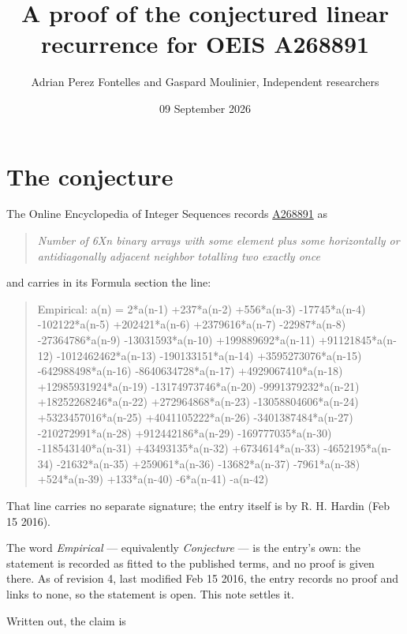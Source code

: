 \documentclass[11pt]{article}
\title{A proof of the conjectured linear recurrence for OEIS A268891}
\author{Adrian Perez Fontelles and Gaspard Moulinier, Independent researchers}
\date{09 September 2026}
\theoremstyle{definition}
\begin{document}
\maketitle
\section{The conjecture}

The Online Encyclopedia of Integer Sequences records \href{https://oeis.org/A268891}{A268891} as

\begin{quote}\itshape Number of 6Xn binary arrays with some element plus some horizontally or antidiagonally adjacent neighbor totalling two exactly once\end{quote}

and carries in its Formula section the line:

\begin{quote}\ttfamily Empirical: a(n) = 2*a(n-1) +237*a(n-2) +556*a(n-3) -17745*a(n-4) -102122*a(n-5) +202421*a(n-6) +2379616*a(n-7) -22987*a(n-8) -27364786*a(n-9) -13031593*a(n-10) +199889692*a(n-11) +91121845*a(n-12) -1012462462*a(n-13) -190133151*a(n-14) +3595273076*a(n-15) -642988498*a(n-16) -8640634728*a(n-17) +4929067410*a(n-18) +12985931924*a(n-19) -13174973746*a(n-20) -9991379232*a(n-21) +18252268246*a(n-22) +272964868*a(n-23) -13058804606*a(n-24) +5323457016*a(n-25) +4041105222*a(n-26) -3401387484*a(n-27) -210272991*a(n-28) +912442186*a(n-29) -169777035*a(n-30) -118543140*a(n-31) +43493135*a(n-32) +6734614*a(n-33) -4652195*a(n-34) -21632*a(n-35) +259061*a(n-36) -13682*a(n-37) -7961*a(n-38) +524*a(n-39) +133*a(n-40) -6*a(n-41) -a(n-42)\end{quote}

That line carries no separate signature; the entry itself is by R. H. Hardin (Feb 15 2016).

The word {\itshape Empirical} --- equivalently {\itshape Conjecture} --- is the entry's own: the statement is recorded as fitted to the published terms, and no proof is given there. As of revision 4, last modified Feb 15 2016, the entry records no proof and links to none, so the statement is open. This note settles it.

Written out, the claim is
\end{document}
